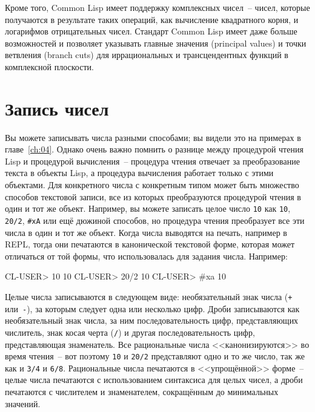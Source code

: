 Кроме того, Common Lisp имеет поддержку комплексных чисел~-- чисел, которые получаются в
результате таких операций, как вычисление квадратного корня, и логарифмов отрицательных
чисел. Стандарт Common Lisp имеет даже больше возможностей и позволяет указывать главные
значения (principal values) и точки ветвления (branch cuts) для иррациональных и
трансцендентных функций в комплексной плоскости.

\section{Запись чисел}

Вы можете записывать числа разными способами; вы видели это на примерах в
главе~\ref{ch:04}.  Однако очень важно помнить о разнице между процедурой чтения Lisp и
процедурой вычисления~-- процедура чтения отвечает за преобразование текста в объекты
Lisp, а процедура вычисления работает только с этими объектами.  Для конкретного числа с
конкретным типом может быть множество способов текстовой записи, все из которых
преобразуются процедурой чтения в один и тот же объект.  Например, вы можете записать
целое число \lstinline{10} как \lstinline{10}, \lstinline{20/2}, \lstinline{#xA} или ещё дюжиной способов,
но процедура чтения преобразует все эти числа в один и тот же объект.  Когда числа
выводятся на печать, например в REPL, тогда они печатаются в канонической текстовой форме,
которая может отличаться от той формы, что использовалась для задания числа.
Например:

\begin{myverb}
CL-USER> 10
10
CL-USER> 20/2
10
CL-USER> #xa
10
\end{myverb}

Целые числа записываются в следующем виде: необязательный знак числа (\lstinline{+} или~\lstinline{-}), за
которым следует одна или несколько цифр.  Дроби записываются как необязательный знак
числа, за ним последовательность цифр, представляющих числитель, знак косая черта
(\lstinline{/}) и другая последовательность цифр, представляющая знаменатель.  Все
рациональные числа <<канонизируются>> во время чтения~-- вот поэтому \lstinline{10} и \lstinline{20/2}
представляют одно и то же число, так же как и \lstinline{3/4} и \lstinline{6/8}.  Рациональные числа
печатаются в <<упрощённой>> форме~-- целые числа печатаются с использованием синтаксиса для
целых чисел, а дроби печатаются с числителем и знаменателем, сокращённым до минимальных
значений.

